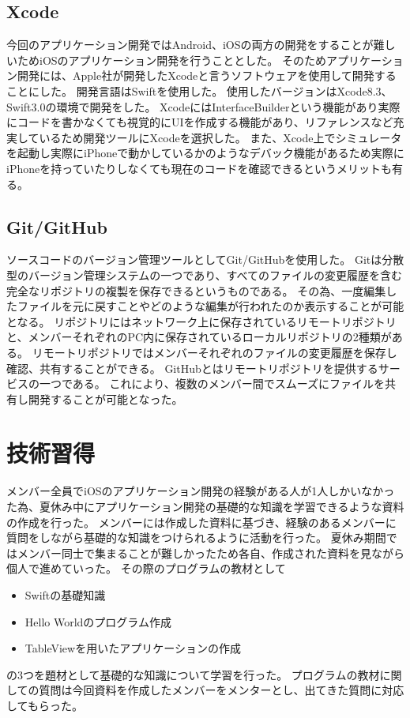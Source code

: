 \documentclass[openany,11pt,papersize]{jsbook}
\begin{document}

\subsection{Xcode}
今回のアプリケーション開発ではAndroid、iOSの両方の開発をすることが難しいためiOSのアプリケーション開発を行うこととした。
そのためアプリケーション開発には、Apple社が開発したXcodeと言うソフトウェアを使用して開発することにした。
開発言語はSwiftを使用した。
使用したバージョンはXcode8.3、Swift3.0の環境で開発をした。
XcodeにはInterfaceBuilderという機能があり実際にコードを書かなくても視覚的にUIを作成する機能があり、リファレンスなど充実しているため開発ツールにXcodeを選択した。
また、Xcode上でシミュレータを起動し実際にiPhoneで動かしているかのようなデバック機能があるため実際にiPhoneを持っていたりしなくても現在のコードを確認できるというメリットも有る。


\subsection{Git/GitHub}
ソースコードのバージョン管理ツールとしてGit/GitHubを使用した。
Gitは分散型のバージョン管理システムの一つであり、すべてのファイルの変更履歴を含む完全なリポジトリの複製を保存できるというものである。
その為、一度編集したファイルを元に戻すことやどのような編集が行われたのか表示することが可能となる。
リポジトリにはネットワーク上に保存されているリモートリポジトリと、メンバーそれぞれのPC内に保存されているローカルリポジトリの2種類がある。
リモートリポジトリではメンバーそれぞれのファイルの変更履歴を保存し確認、共有することができる。
GitHubとはリモートリポジトリを提供するサービスの一つである。
これにより、複数のメンバー間でスムーズにファイルを共有し開発することが可能となった。


\section{技術習得}
メンバー全員でiOSのアプリケーション開発の経験がある人が1人しかいなかった為、夏休み中にアプリケーション開発の基礎的な知識を学習できるような資料の作成を行った。
メンバーには作成した資料に基づき、経験のあるメンバーに質問をしながら基礎的な知識をつけられるように活動を行った。
夏休み期間ではメンバー同士で集まることが難しかったため各自、作成された資料を見ながら個人で進めていった。
その際のプログラムの教材として
\begin{itemize}

\item Swiftの基礎知識
\item Hello Worldのプログラム作成
\item TableViewを用いたアプリケーションの作成

\end{itemize}
の3つを題材として基礎的な知識について学習を行った。
プログラムの教材に関しての質問は今回資料を作成したメンバーをメンターとし、出てきた質問に対応してもらった。
\end{document}
